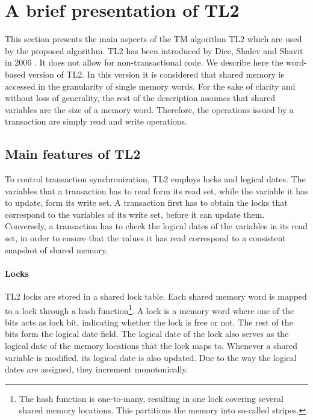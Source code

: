 \documentclass[11pt,letterpaper]{article}
\begin{document}
\section{A brief presentation of TL2}
\label{sec:tl2}

This section presents the main  aspects of the  TM algorithm TL2  which  are  
used by the proposed algorithm. TL2 has been introduced by Dice, Shalev and Shavit 
in    2006    \cite{dice06}.   It does not allow for  non-transactional code.  We describe 
here the word-based version of TL2. In this  version it is considered that shared  memory 
is accessed in the granularity of  single  memory words.  For the sake of  clarity and without 
loss  of generality, the rest of the description  assumes that shared variables are the size of a 
memory word. Therefore,  the operations issued by a transaction are simply read and write operations.  



\subsection{Main features of TL2}
To control transaction synchronization, TL2 employs locks and 
logical dates. The variables  that a  transaction has to read form its read
set, while the variable it has to update, form its write set.  
A  transaction  first  has to  obtain  the  locks  that correspond  to  the
variables of its write set, before it can  
update them.  Conversely, a  transaction has to  check the logical dates  of the
variables in its read set, in  
order to  ensure that  the values  it has read  correspond to  a consistent
snapshot of shared memory.  


\paragraph{Locks}
TL2 locks  are stored in  a shared lock  table. Each shared memory  word is
mapped to a lock through a  
hash function\footnote{The  hash function is one-to-many,  resulting in one
lock covering several shared  
memory locations. This  partitions the memory into  so-called stripes.}. A
lock is a memory word where  
one of the  bits acts as lock  bit, indicating whether the lock  is free or
not. The rest of the bits form the  
logical date field.  The logical date of the lock  also serves as the 
logical date of the
memory  locations that  the lock  maps to.  Whenever a  shared  variable is
modified, its logical date is also updated. Due to the way the  
logical dates are assigned, they increment monotonically. 
\end{document}
